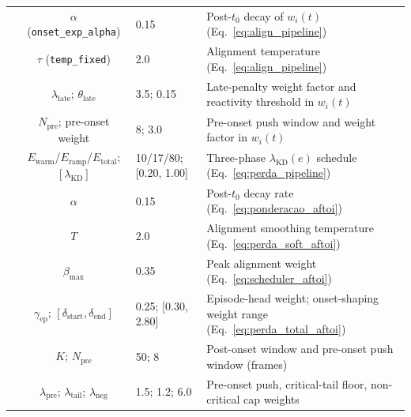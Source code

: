 \documentclass[a4paper,fleqn]{cas-dc}
\begin{document}
\begin{table}[!tbp]
\begin{tabularx}{\textwidth}{l c l X}
 & {\color{\revcolor}$\alpha$ (\texttt{onset\_exp\_alpha})} & {\color{\revcolor}0.15} & {\color{\revcolor}Post-$t_0$ decay of $w_i(t)$ (Eq.~\ref{eq:align_pipeline})} \\
 & {\color{\revcolor}$\tau$ (\texttt{temp\_fixed})}            & {\color{\revcolor}2.0}  & {\color{\revcolor}Alignment temperature (Eq.~\ref{eq:align_pipeline})} \\
 & {\color{\revcolor}$\lambda_{\text{late}}$; $\theta_{\text{late}}$} & {\color{\revcolor}3.5; 0.15} & {\color{\revcolor}Late-penalty weight factor and reactivity threshold in $w_i(t)$} \\
 & {\color{\revcolor}$N_{\text{pre}}$; pre-onset weight} & {\color{\revcolor}8; 3.0} & {\color{\revcolor}Pre-onset push window and weight factor in $w_i(t)$} \\
 & {\color{\revcolor}$E_{\text{warm}}$/$E_{\text{ramp}}$/$E_{\text{total}}$; $[\lambda_{\mathrm{KD}}]$} & {\color{\revcolor}10/17/80; [0.20, 1.00]} & {\color{\revcolor}Three-phase $\lambda_{\mathrm{KD}}(e)$ schedule (Eq.~\ref{eq:perda_pipeline})} \\
\midrule
{}
 & {\color{\revcolor}$\alpha$} & {\color{\revcolor}0.15} & {\color{\revcolor}Post-$t_0$ decay rate (Eq.~\ref{eq:ponderacao_aftoi})} \\
 & {\color{\revcolor}$T$}            & {\color{\revcolor}2.0}  & {\color{\revcolor}Alignment smoothing temperature (Eq.~\ref{eq:perda_soft_aftoi})} \\
 & {\color{\revcolor}$\beta_{\max}$} & {\color{\revcolor}0.35} & {\color{\revcolor}Peak alignment weight (Eq.~\ref{eq:scheduler_aftoi})} \\
 & {\color{\revcolor}$\gamma_{\mathrm{ep}}$; $[\delta_{\text{start}},\delta_{\text{end}}]$} & {\color{\revcolor}0.25; [0.30, 2.80]} & {\color{\revcolor}Episode-head weight; onset-shaping weight range (Eq.~\ref{eq:perda_total_aftoi})} \\
 & {\color{\revcolor}$K$; $N_{\text{pre}}$} & {\color{\revcolor}50; 8} & {\color{\revcolor}Post-onset window and pre-onset push window (frames)} \\
 & {\color{\revcolor}$\lambda_{\text{pre}}$; $\lambda_{\text{tail}}$; $\lambda_{\text{neg}}$} & {\color{\revcolor}1.5; 1.2; 6.0} & {\color{\revcolor}Pre-onset push, critical-tail floor, non-critical cap weights} \\

\end{tabularx}
\end{table}
\end{document}
